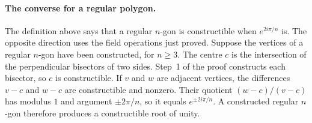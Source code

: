 \paragraph{The converse for a regular polygon.}\label{par:ngon-converse}
The definition above says that a regular $n$-gon is constructible when $e^{2i\pi/n}$ is. The opposite direction uses the field operations just proved. Suppose the vertices of a regular $n$-gon have been constructed, for $n\ge3$. The centre $c$ is the intersection of the perpendicular bisectors of two sides. Step~1 of the proof constructs each bisector, so $c$ is constructible. If $v$ and $w$ are adjacent vertices, the differences $v-c$ and $w-c$ are constructible and nonzero. Their quotient $(w-c)/(v-c)$ has modulus $1$ and argument $\pm2\pi/n$, so it equals $e^{\pm2i\pi/n}$. A constructed regular $n$-gon therefore produces a constructible root of unity.

